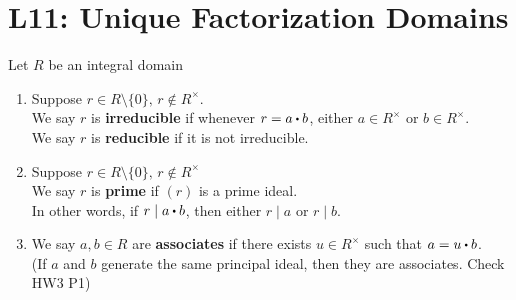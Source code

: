 \documentclass[../Main.tex]{subfiles}
\begin{document}
\chapter{L11: Unique Factorization Domains}
\begin{dfn}[title = {Irreducible/Reducible, Prime, Associate Elements}]
	Let $R$ be an integral domain
	\begin{enumerate}
		\item Suppose $r\in R\setminus\{0\},\, r\notin R^\times$.\\
		We say $r$ is \textbf{irreducible} if whenever $r=a\rdot b$, either $a\in R^\times$ or $b\in R^\times$.\\
		We say $r$ is \textbf{reducible} if it is not irreducible.
		\item Suppose $r\in R\setminus\{0\},\, r\notin R^\times$\\
		We say $r$ is \textbf{prime} if $(r)$ is a prime ideal.\\
		In other words, if $r\mid a\rdot b$, then either $r\mid a$ or $r\mid b$.
		\item We say $a,b \in R$ are \textbf{associates} if there exists $u\in R^\times$ such that $a=u\rdot b$.\\ (If $a$ and $b$ generate the same principal ideal, then they are associates. Check HW3 P1)
	\end{enumerate}
\end{dfn}
\end{document}
